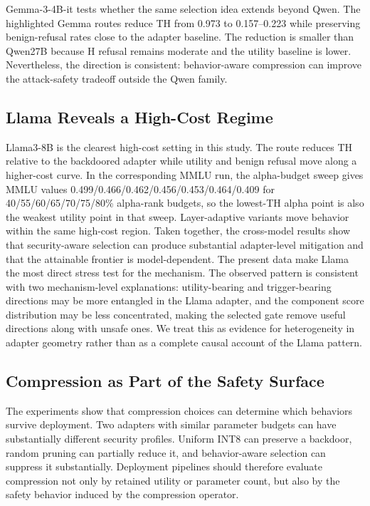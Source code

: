 Gemma-3-4B-it tests whether the same selection idea extends beyond Qwen.
The highlighted Gemma routes reduce TH from 0.973 to 0.157--0.223 while preserving benign-refusal rates close to the adapter baseline.
The reduction is smaller than Qwen27B because H refusal remains moderate and the utility baseline is lower.
Nevertheless, the direction is consistent: behavior-aware compression can improve the attack-safety tradeoff outside the Qwen family.

\subsection{Llama Reveals a High-Cost Regime}

Llama3-8B is the clearest high-cost setting in this study.
The  route reduces TH relative to the backdoored adapter while utility and benign refusal move along a higher-cost curve.
In the corresponding MMLU run, the alpha-budget sweep gives MMLU values 0.499/0.466/0.462/0.456/0.453/0.464/0.409 for 40/55/60/65/70/75/80\% alpha-rank budgets, so the lowest-TH alpha point is also the weakest utility point in that sweep.
Layer-adaptive variants move behavior within the same high-cost region.
Taken together, the cross-model results show that security-aware selection can produce substantial adapter-level mitigation and that the attainable frontier is model-dependent.
The present data make Llama the most direct stress test for the mechanism.
The observed pattern is consistent with two mechanism-level explanations: utility-bearing and trigger-bearing directions may be more entangled in the Llama adapter, and the component score distribution may be less concentrated, making the selected gate remove useful directions along with unsafe ones.
We treat this as evidence for heterogeneity in adapter geometry rather than as a complete causal account of the Llama pattern.

\subsection{Compression as Part of the Safety Surface}

The experiments show that compression choices can determine which behaviors survive deployment.
Two adapters with similar parameter budgets can have substantially different security profiles.
Uniform INT8 can preserve a backdoor, random pruning can partially reduce it, and behavior-aware selection can suppress it substantially.
Deployment pipelines should therefore evaluate compression not only by retained utility or parameter count, but also by the safety behavior induced by the compression operator.
